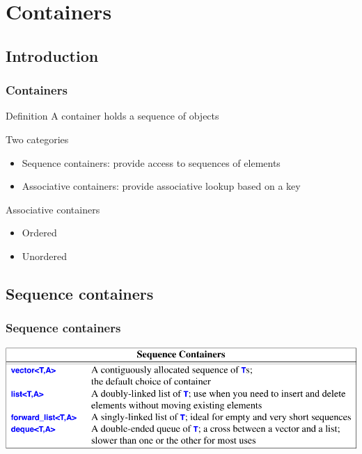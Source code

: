\section{Containers}
\subsection{Introduction}
\begin{frame}
  \frametitle{Containers}
  \begin{block}{Definition}
    A container holds a sequence of objects
  \end{block}
  \vfill
  \begin{block}{Two categories}
    \begin{itemize}
    \item Sequence containers: provide access to sequences of elements
    \item Associative containers: provide associative lookup based on a key
    \end{itemize}
  \end{block}
  \vfill
  \begin{block}{Associative containers}
    \begin{itemize}
    \item Ordered
    \item Unordered
    \end{itemize}
  \end{block}
\end{frame}

\subsection{Sequence containers}
\begin{frame}
  \frametitle{Sequence containers}
  \centering
  \includegraphics[width=\textwidth]{img/sequence_containers.png}
\end{frame}

